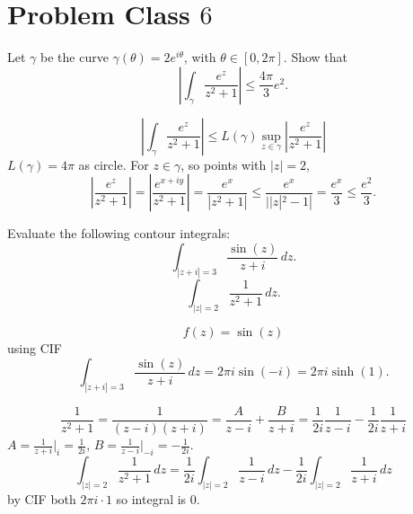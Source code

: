 \documentclass[10pt, a4paper]{article}
\begin{document}
\newpage

\section{Problem Class \texorpdfstring{$6$}{}}

\begin{problem}
    Let $\gamma$ be the curve $\gamma(\theta) = 2e ^ {i\theta}$,
    with $\theta \in [0, 2\pi]$.
    Show that
    \[
    \left|\int_{\gamma}\frac{e ^ z}{z ^ 2 + 1}\right| \leq \frac{4\pi}{3}e ^ 2.
    \]

    \begin{solution}
        \[
        \left|\int_{\gamma}\frac{e ^ z}{z ^ 2 + 1}\right| \leq L(\gamma)\sup_{z \in \gamma}\left|\frac{e ^ z}{z ^ 2 + 1}\right|
        \]
        $L(\gamma) = 4\pi$ as circle.
        For $z \in \gamma$,
        so points with $|z| = 2$,
        \[
        \left|\frac{e ^ z}{z ^ 2 + 1}\right| = \left|\frac{e ^ {x + iy}}{z ^ 2 + 1}\right| = \frac{e ^ x}{|z ^ 2 + 1|} \leq \frac{e ^ x}{||z| ^ 2 - 1|} = \frac{e ^ x}{3} \leq \frac{e ^ 2}{3}.
        \]
    \end{solution}
\end{problem}

\begin{problem}
    Evaluate the following contour integrals:
    \[
    \int_{|z + i| = 3}\frac{\sin(z)}{z + i}\,dz.
    \]
    \[
    \int_{|z| = 2}\frac{1}{z ^ 2 + 1}\,dz.
    \]

    \begin{solution}
        \[
        f(z) = \sin(z)
        \]
        using CIF
        \[
        \int_{|z + i| = 3}\frac{\sin(z)}{z + i}\,dz = 2\pi i \sin(-i) = 2\pi i\sinh(1).
        \]

        \[
        \frac{1}{z ^ 2 + 1} = \frac{1}{(z - i)(z + i)} = \frac{A}{z - i} + \frac{B}{z + i} = \frac{1}{2i}\frac{1}{z - i} - \frac{1}{2i}\frac{1}{z + i}
        \]
        $A = \frac{1}{z + i}\big|_{i} = \frac{1}{2i}$,
        $B = \frac{1}{z - i}\big|_{-i} = -\frac{1}{2i}$.
        \[
        \int_{|z| = 2}\frac{1}{z ^ 2 + 1}\,dz = \frac{1}{2i}\int_{|z| = 2}\frac{1}{z - i}\,dz - \frac{1}{2i}\int_{|z| = 2}\frac{1}{z + i}\,dz
        \]
        by CIF both $2\pi i \cdot 1$ so integral is $0$.
    \end{solution}
\end{problem}
\end{document}
